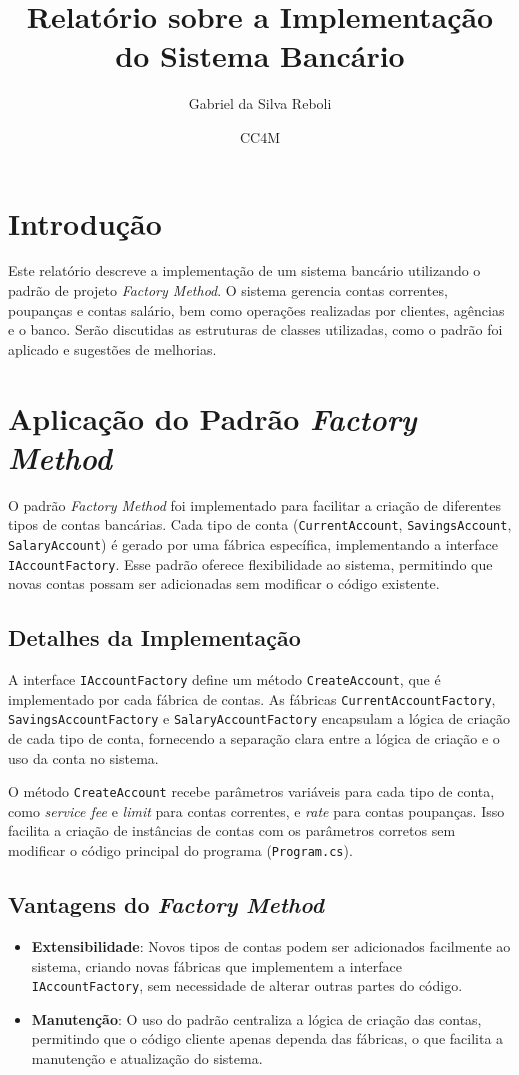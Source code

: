 \documentclass{article}
\title{Relatório sobre a Implementação do Sistema Bancário}
\author{Gabriel da Silva Reboli}
\date{CC4M}
\begin{document}
\maketitle

\section{Introdução}
Este relatório descreve a implementação de um sistema bancário utilizando o padrão de projeto \textit{Factory Method}. O sistema gerencia contas correntes, poupanças e contas salário, bem como operações realizadas por clientes, agências e o banco. Serão discutidas as estruturas de classes utilizadas, como o padrão foi aplicado e sugestões de melhorias.

\section{Aplicação do Padrão \textit{Factory Method}}
O padrão \textit{Factory Method} foi implementado para facilitar a criação de diferentes tipos de contas bancárias. Cada tipo de conta (\texttt{CurrentAccount}, \texttt{SavingsAccount}, \texttt{SalaryAccount}) é gerado por uma fábrica específica, implementando a interface \texttt{IAccountFactory}. Esse padrão oferece flexibilidade ao sistema, permitindo que novas contas possam ser adicionadas sem modificar o código existente.

\subsection{Detalhes da Implementação}
A interface \texttt{IAccountFactory} define um método \texttt{CreateAccount}, que é implementado por cada fábrica de contas. As fábricas \texttt{CurrentAccountFactory}, \texttt{SavingsAccountFactory} e \texttt{SalaryAccountFactory} encapsulam a lógica de criação de cada tipo de conta, fornecendo a separação clara entre a lógica de criação e o uso da conta no sistema.

O método \texttt{CreateAccount} recebe parâmetros variáveis para cada tipo de conta, como \textit{service fee} e \textit{limit} para contas correntes, e \textit{rate} para contas poupanças. Isso facilita a criação de instâncias de contas com os parâmetros corretos sem modificar o código principal do programa (\texttt{Program.cs}).

\subsection{Vantagens do \textit{Factory Method}}
\begin{itemize}
    \item \textbf{Extensibilidade}: Novos tipos de contas podem ser adicionados facilmente ao sistema, criando novas fábricas que implementem a interface \texttt{IAccountFactory}, sem necessidade de alterar outras partes do código.
    \item \textbf{Manutenção}: O uso do padrão centraliza a lógica de criação das contas, permitindo que o código cliente apenas dependa das fábricas, o que facilita a manutenção e atualização do sistema.
\end{itemize}
\end{document}
